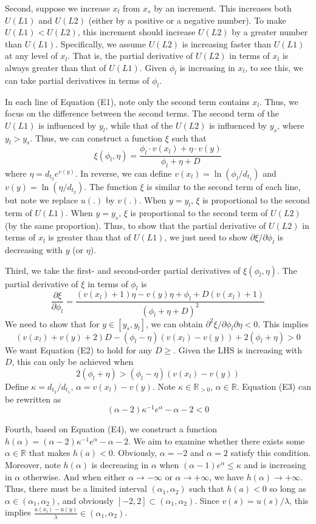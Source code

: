 Second, suppose we increase \(x_l\) from \(x_s\) by an increment. This
increases both \(U(L1)\) and \(U(L2)\) (either by a positive or a
negative number). To make \(U(L1)<U(L2)\), this increment should
increase \(U(L2)\) by a greater number than \(U(L1)\). Specifically, we
assume \(U(L2)\) is increasing faster than \(U(L1)\) at any level of
\(x_l\). That is, the partial derivative of \(U(L2)\) in terms of
\(x_l\) is always greater than that of \(U(L1)\). Given \(\phi_l\) is
increasing in \(x_l\), to see this, we can take partial derivatives in
terms of \(\phi_l\).

In each line of Equation (E1), note only the second term contains
\(x_l\). Thus, we focus on the difference between the second terms. The
second term of the \(U(L1)\) is influenced by \(y_l\), while that of the
\(U(L2)\) is influenced by \(y_s\), where \(y_l>y_s\). Thus, we can
construct a function \(\xi\) such that\[
\xi(\phi_l,\eta) = \frac{\phi_l \cdot v(x_l)+\eta\cdot v(y)}{\phi_l+\eta+D}
\]where \(\eta=d_{t_2}e^{v(y)}\). In reverse, we can define
\(v(x_l)=\ln(\phi_l/d_{t_1})\) and \(v(y)=\ln(\eta/d_{t_2})\). The
function \(\xi\) is similar to the second term of each line, but note we
replace \(u(.)\) by \(v(.)\). When \(y=y_l\), \(\xi\) is proportional to
the second term of \(U(L1)\). When \(y=y_s\), \(\xi\) is proportional to
the second term of \(U(L2)\) (by the same proportion). Thus, to show
that the partial derivative of \(U(L2)\) in terms of \(x_l\) is greater
than that of \(U(L1)\), we just need to show
\(\partial \xi/\partial \phi_l\) is decreasing with \(y\) (or \(\eta\)).

Third, we take the first- and second-order partial derivatives of
\(\xi(\phi_l,\eta)\). The partial derivative of \(\xi\) in terms of
\(\phi_l\) is\[
\frac{\partial \xi}{\partial \phi_l}=\frac{(v(x_l)+1)\eta-v(y)\eta+\phi_l+D(v(x_l)+1)}{(\phi_l+\eta+D)^2}
\]We need to show that for \(y\in[y_s,y_l]\), we can obtain
\(\partial^2 \xi/\partial \phi_l\partial \eta<0\). This
implies\[\tag{E2}
(v(x_l)+v(y)+2)D-(\phi_l-\eta)(v(x_l)-v(y))+2(\phi_l+\eta)>0
\]We want Equation (E2) to hold for any \(D\geq\). Given the LHS is
increasing with \(D\), this can only be achieved when\[\tag{E3}
2(\phi_l+\eta)>(\phi_l-\eta)(v(x_l)-v(y))
\]Define \(\kappa=d_{t_2}/d_{t_1}\), \(\alpha=v(x_l)-v(y)\). Note
\(\kappa\in \mathbb{R}_{>0}\), \(\alpha\in\mathbb{R}\). Equation (E3)
can be rewritten as\[\tag{E4}
(\alpha-2)\kappa^{-1} e^{\alpha}-\alpha-2<0
\]

Fourth, based on Equation (E4), we construct a function
\(h(\alpha)=(\alpha-2)\kappa^{-1} e^\alpha-\alpha-2\). We aim to examine
whether there exists some \(\alpha\in\mathbb{R}\) that makes \(h(a)<0\).
Obviously, \(\alpha=-2\) and \(\alpha=2\) satisfy this condition.
Moreover, note \(h(\alpha)\) is decreasing in \(\alpha\) when
\((\alpha-1)e^{\alpha}\leq \kappa\) and is increasing in \(\alpha\)
otherwise. And when either \(\alpha\rightarrow -\infty\) or
\(\alpha \rightarrow +\infty\), we have
\(h(\alpha)\rightarrow +\infty\). Thus, there must be a limited interval
\((\alpha_1,\alpha_2)\) such that \(h(a)<0\) so long as
\(\alpha\in(\alpha_1,\alpha_2)\), and obviously
\([-2,2]\subset(\alpha_1,\alpha_2)\). Since \(v(s)=u(s)/\lambda\), this
implies \(\frac{u(x_l)-u(y)}{\lambda}\in(\alpha_1,\alpha_2)\).


